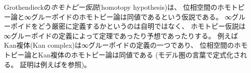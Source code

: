 \documentclass[index]{subfiles}
\begin{document}
Grothendieckの\emph{ホモトピー仮説}(homotopy hypothesis)は、
位相空間のホモトピー論と∞グルーポイドのホモトピー論は同値であるという仮説である。
∞グルーポイドをどう厳密に定義するかというのは自明ではなく、
ホモトピー仮説は∞グルーポイドの定義によって定理であったり予想であったりする。
例えばKan複体(Kan complex)は∞グルーポイドの定義の一つであり、
位相空間のホモトピー論とKan複体のホモトピー論は同値である
(モデル圏の言葉で定式化される。
証明は例えばを参照)。
\end{document}
